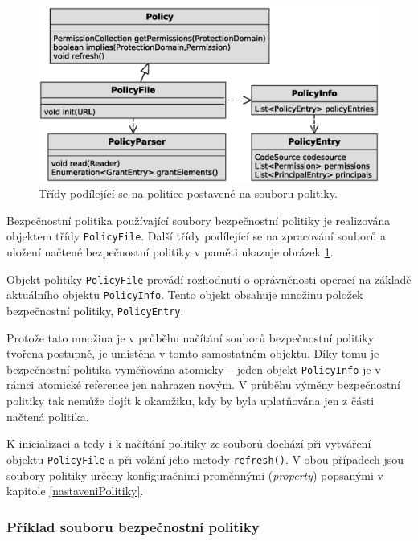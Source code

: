 \begin{figure}[ht]
  \centering
  \includegraphics[width=12cm]{fig/policy-schema}
  \caption{Třídy podílející se na politice postavené na souboru politiky.}
  \label{tridyPolicyFile}
\end{figure}

Bezpečnostní politika používající soubory bezpečnostní politiky je realizována objektem třídy {\tt PolicyFile}.
Další třídy podílející se na zpracování souborů a uložení načtené bezpečnostní politiky v paměti ukazuje obrázek \ref{tridyPolicyFile}.

Objekt politiky {\tt PolicyFile} provádí rozhodnutí o oprávněnosti operací na základě aktuálního objektu {\tt PolicyInfo}.
Tento objekt obsahuje množinu položek bezpečnostní politiky, {\tt PolicyEntry}.

Protože tato množina je v průběhu načítání souborů bezpečnostní politiky tvořena postupně, je umístěna v tomto samostatném objektu.
Díky tomu je bezpečnostní politika vyměňována atomicky -- jeden objekt {\tt PolicyInfo} je v rámci atomické reference jen nahrazen novým.
V průběhu výměny bezpečnostní politiky tak nemůže dojít k okamžiku, kdy by byla uplatňována jen z části načtená politika.

K inicializaci a tedy i k načítání politiky ze souborů dochází při vytváření objektu {\tt PolicyFile} a při volání jeho metody {\tt refresh()}.
V obou případech jsou soubory politiky určeny konfiguračními proměnnými ({\it property}) popsanými v kapitole \ref{nastaveniPolitiky}.

\subsubsection{Příklad souboru bezpečnostní politiky}

